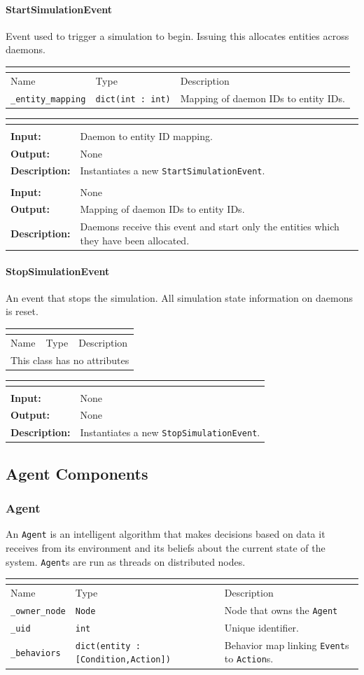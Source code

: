 \documentclass[titlepage]{article}
\newcommand{\operations}[1]{
\begin{center}
    \begin{longtable}{|p{4cm}|p{10cm + 2.0\tabcolsep}|}
    \hline
    \multicolumn{2}{|l|}{\cellcolor[gray]{0.5}{\textbf{Operations}}} \\ \hline
#1
    \end{longtable}
\end{center}
}
\newcommand{\operation}[4]{
    \hline
    \multicolumn{2}{|l|}{\cellcolor[gray]{0.8}{\texttt{#1}}} \\ \hline
    \hspace{7pt}\textbf{Input:} & #2 \\ \hline
    \hspace{7pt}\textbf{Output:} & #3 \\ \hline
    \hspace{7pt}\textbf{Description:} & #4 \\ \hline
}
\newcommand{\noattributes}{
    \begin{center}
        \begin{tabular}{|p{3cm}|p{3cm}|p{8cm}|}
            \multicolumn{3}{|l|}{\cellcolor[gray]{0.5}{\textbf{Attributes}}} \\ \hline
            \rowcolor[gray]{0.8} Name & Type & Description \\ \hline 
            \multicolumn{3}{|c|}{This class has no attributes} \\ \hline
        \end{tabular}
    \end{center}
}
\newcommand{\attributes}[1]{
    \begin{center}
        \begin{tabular}{|p{3.5cm}|p{3.5cm}|p{7cm}|}
            \multicolumn{3}{|l|}{\cellcolor[gray]{0.5}{\textbf{Attributes}}} \\ \hline
            \rowcolor[gray]{0.8} Name & Type & Description \\ \hline 
            #1
        \end{tabular}
    \end{center}
}
\newcommand{\attribute}[3]{
    \texttt{#1} & \texttt{#2} & #3 \\ \hline
}
\begin{document}
\paragraph{StartSimulationEvent}{Event used to trigger a simulation to begin.  Issuing this allocates entities across daemons.}
\attributes
{
    \attribute{\_entity\_mapping}{dict(int : int)}{Mapping of daemon IDs to entity IDs.}
}

\operations
{
    \operation{\_\_init\_\_(entity\_mapping)}{Daemon to entity ID mapping.}{None}{Instantiates a new \texttt{StartSimulationEvent}.}
    \operation{get\_mapping()}{None}{Mapping of daemon IDs to entity IDs.}{Daemons receive this event and start only the entities which they have been allocated.}
}

\paragraph{StopSimulationEvent}{An event that stops the simulation.  All simulation state information on daemons is reset.}

\noattributes

\operations
{
    \operation{\_\_init\_\_()}{None}{None}{Instantiates a new \texttt{StopSimulationEvent}.}
}

\subsection{Agent Components}
\subsubsection{Agent}
{An \texttt{Agent} is an intelligent algorithm that makes decisions based on data it receives from its environment and its beliefs about the current state of the system. \texttt{Agent}s are run as threads on distributed nodes. }

\attributes{
    \attribute{\_owner\_node}{\texttt{Node}}{Node that owns the \texttt{Agent}}
    \attribute{\_uid}{int}{Unique identifier.}
    \attribute{\_behaviors}{dict(entity : [\texttt{Condition},\texttt{Action}])}{Behavior map linking \texttt{Event}s to \texttt{Action}s.}
}
\end{document}
